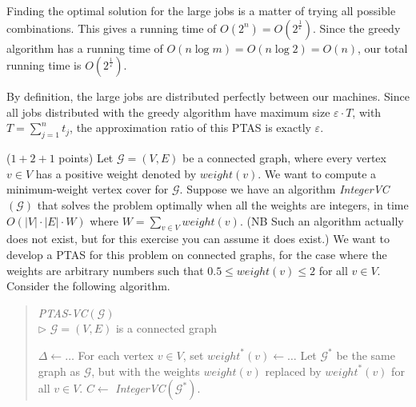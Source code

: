 \documentclass{article}
\newcommand{\G}{\ensuremath{\mathcal{G}}}
\newcommand{\graph}{\G}
\newcommand{\eps}{\varepsilon}
\renewcommand{\leq}{\leqslant}
\newcommand{\weight}{\mathit{weight}}
\newcounter{rcounter}
\newenvironment{rlist}%
{\begin{list}{\setnr-\arabic{rcounter}}{\usecounter{rcounter}}}{\end{list}}
\begin{document}
\begin{rlist}
\begin{enumerate}
            Finding the optimal solution for the large jobs is a matter of trying all possible combinations. This gives a running time of $O(2^n)=O(2^{\frac{1}{\eps}})$. Since the greedy algorithm has a running time of $O(n \log m)=O(n \log 2)=O(n)$, our total running time is $O(2^{\frac{1}{\eps}})$.
            
            By definition, the large jobs are distributed perfectly between our machines. Since all jobs distributed with the greedy algorithm have maximum size $\eps \cdot T$, with $T=\sum_{j=1}^{n}t_j$, the approximation ratio of this PTAS is exactly $\eps$.
        \end{enumerate}
        \item ($1 + 2 + 1$ points)
        Let $\graph=(V,E)$ be a connected graph, where every vertex $v\in V$ 
        has a positive weight denoted by $\weight(v)$. We want to compute a 
        minimum-weight vertex cover for $\graph$.
        Suppose we have an algorithm \emph{IntegerVC}$(\graph)$ that solves the problem optimally when all the weights are integers, in time $O( |V|\cdot |E|\cdot W)$ where $W = \sum_{v\in V} \weight(v)$.
        (NB Such an algorithm actually does not exist, but for this exercise you can assume it does exist.)
        We want to develop a PTAS for this problem on connected graphs, for the case where the weights are arbitrary numbers such that $0.5 \leq \weight(v) \leq 2$ for all $v\in V$.
        Consider the following algorithm.
        \begin{algorithm}
            \vspace*{2mm}
            \begin{quotation}
                \noindent
                \emph{PTAS-VC}$(\graph)$ \\
                $\rhd$ $\graph=(V,E)$ is a connected graph \\[-5mm]
                \begin{algorithmic}[1]
                    \State $\Delta \gets \ldots$
                    \State For each vertex $v\in V$, set $\weight^*(v) \gets \ldots$
                    \State Let $\graph^*$ be the same graph as $\graph$, but with the weights $\weight(v)$
                    replaced by $\weight^*(v)$ for all $v\in V$.
                    \State $C  \gets$ \emph{IntegerVC}$(\graph^*)$.
                \end{algorithmic}
            \end{quotation}

\end{algorithm}
\end{rlist}
\end{document}
